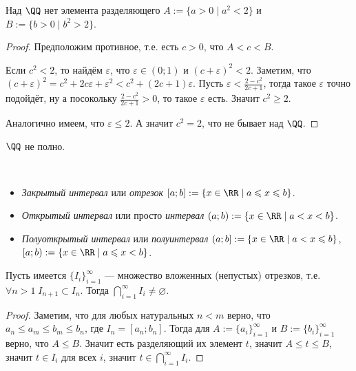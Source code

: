 \documentclass[12pt,a4paper]{article}
\begin{document}
    \begin{statement*}
        Над $\QQ$ нет  элемента разделяющего $A := \{a > 0 \mid a^2 < 2\}$ и $B := \{b > 0 \mid b^2 > 2\}$.
    \end{statement*}

    \begin{proof}
        Предположим противное, т.е. есть $c > 0$, что $A < c < B$.

        Если $c^2 < 2$, то найдём $\varepsilon$, что $\varepsilon \in (0; 1)$ и $(c + \varepsilon)^2 < 2$. Заметим, что $(c + \varepsilon)^2 = c^2 + 2c\varepsilon + \varepsilon^2 < c^2 + (2c + 1)\varepsilon$. Пусть $\varepsilon < \frac{2 - c^2}{2c+ 1}$, тогда такое $\varepsilon$ точно подойдёт, ну а посокольку $\frac{2 - c^2}{2c + 1} > 0$, то такое $\varepsilon$ есть. Значит $c^2 \geqslant 2$.

        Аналогично имеем, что $\varepsilon \leqslant 2$. А значит $c^2 = 2$, что не бывает над $\QQ$.
    \end{proof}

    \begin{corollary*}
        $\QQ$ не полно.
    \end{corollary*}

    \begin{definition}\
        \begin{itemize}
            \item \emph{Закрытый интервал} или \emph{отрезок} $[a;b]:=\{x\in\RR \mid a \leqslant x \leqslant b\}$.
            \item \emph{Открытый интервал} или просто \emph{интервал} $(a;b):=\{x\in\RR \mid a < x < b\}$.
            \item \emph{Полуоткрытый интервал} или \emph{полуинтервал} $(a;b] := \{x\in\RR \mid a < x \leqslant b\}$, $[a;b):=\{x\in\RR \mid a \leqslant x < b\}$.
        \end{itemize}
    \end{definition}

    \begin{theorem}\label{th_inter_segments}
        Пусть имеется $\{I_i\}_{i=1}^\infty$ --- множество вложенных (непустых) отрезков, т.е. $\forall n > 1\; I_{n+1} \subset I_n$. Тогда $\bigcap_{i=1}^\infty I_i \neq \varnothing$.
    \end{theorem}

    \begin{proof}
        Заметим, что для любых натуральных $n < m$ верно, что $a_n \leqslant a_m \leqslant b_m \leqslant b_n$, где $I_n = [a_n;b_n]$. Тогда для $A:=\{a_i\}_{i=1}^\infty$ и $B:=\{b_i\}_{i=1}^\infty$ верно, что $A \leqslant B$. Значит есть разделяющий их элемент $t$, значит $A \leqslant t \leqslant B$, значит $t\in I_i$ для всех $i$, значит $t \in \bigcap_{i=1}^\infty I_i$.
    \end{proof}
\end{document}
